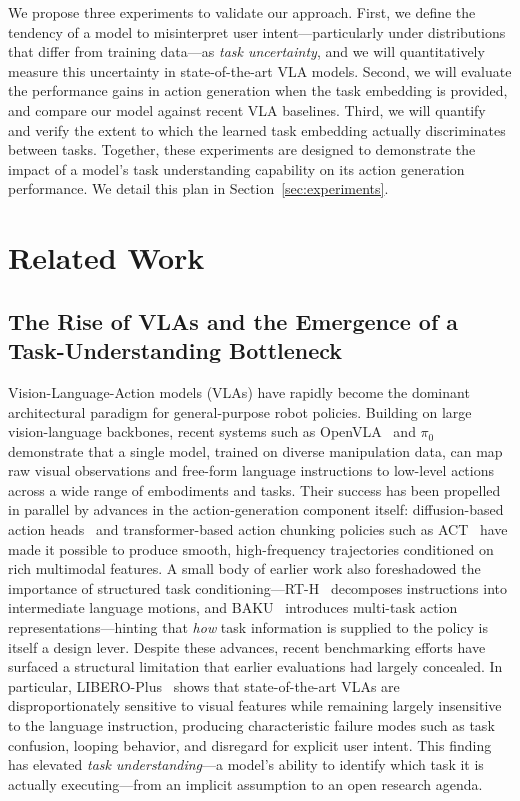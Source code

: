 \documentclass[11pt]{article}
\begin{document}
We propose three experiments to validate our approach. First, we define the tendency of a model to misinterpret user intent---particularly under distributions that differ from training data---as \emph{task uncertainty}, and we will quantitatively measure this uncertainty in state-of-the-art VLA models. Second, we will evaluate the performance gains in action generation when the task embedding is provided, and compare our model against recent VLA baselines. Third, we will quantify and verify the extent to which the learned task embedding actually discriminates between tasks. Together, these experiments are designed to demonstrate the impact of a model's task understanding capability on its action generation performance. We detail this plan in Section~\ref{sec:experiments}.

\section{Related Work}
\label{sec:related}

\subsection{The Rise of VLAs and the Emergence of a Task-Understanding Bottleneck}

Vision-Language-Action models (VLAs) have rapidly become the dominant architectural paradigm for general-purpose robot policies. Building on large vision-language backbones, recent systems such as OpenVLA~\cite{openvla} and $\pi_0$~\cite{pi0} demonstrate that a single model, trained on diverse manipulation data, can map raw visual observations and free-form language instructions to low-level actions across a wide range of embodiments and tasks. Their success has been propelled in parallel by advances in the action-generation component itself: diffusion-based action heads~\cite{diffusionpolicy} and transformer-based action chunking policies such as ACT~\cite{act} have made it possible to produce smooth, high-frequency trajectories conditioned on rich multimodal features. A small body of earlier work also foreshadowed the importance of structured task conditioning---RT-H~\cite{rth} decomposes instructions into intermediate language motions, and BAKU~\cite{baku} introduces multi-task action representations---hinting that \emph{how} task information is supplied to the policy is itself a design lever. Despite these advances, recent benchmarking efforts have surfaced a structural limitation that earlier evaluations had largely concealed. In particular, LIBERO-Plus~\cite{liberoplus} shows that state-of-the-art VLAs are disproportionately sensitive to visual features while remaining largely insensitive to the language instruction, producing characteristic failure modes such as task confusion, looping behavior, and disregard for explicit user intent. This finding has elevated \emph{task understanding}---a model's ability to identify which task it is actually executing---from an implicit assumption to an open research agenda.
\end{document}
